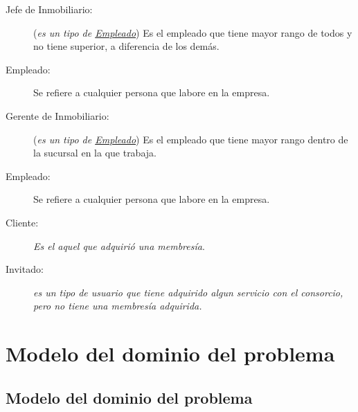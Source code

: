\begin{description}
	
	\item[\hypertarget{tJefe}{Jefe de Inmobiliario:}] ({\em es un tipo de \hyperlink{tEmpleado}{Empleado}}) Es el empleado que tiene mayor rango de todos y no tiene superior, a diferencia de los demás.	
	\item[\hypertarget{tEmpleado}{Empleado:}] Se refiere a cualquier persona que labore en la empresa.
	
	\item[\hypertarget{tGerente}{Gerente de Inmobiliario:}] ({\em es un tipo de \hyperlink{tEmpleado}{Empleado}}) Es el empleado que tiene mayor rango dentro de la sucursal en la que trabaja.	
	\item[\hypertarget{tEmpleado}{Empleado:}] Se refiere a cualquier persona que labore en la empresa.
	 
	\item[\hypertarget{tcliente}{Cliente:}] {\em Es el aquel que adquirió una membresía}.
	
	\item[\hypertarget{tInvitado}{Invitado:}] {\em es un tipo de usuario que tiene adquirido algun servicio con el consorcio, pero no tiene una membresía adquirida.} 

	
	
\end{description}

\section{Modelo del dominio del problema}
\label{sec:hechosDeNegocio}


\subsection{Modelo del dominio del problema}

